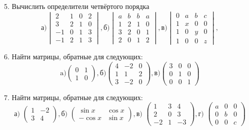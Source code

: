 \documentclass[12pt]{article}
\begin{document}
5. Вычислить определители четвёртого порядка
\[
\text{а)}\begin{vmatrix}
2 & 1 & 0 & 2\\
3 & 2 & 1 & 0\\
-1 & 0 & 1 & 3\\
-1 & 2 & 1 & 3
\end{vmatrix},
\text{б)}\begin{vmatrix}
a & b & b & a\\
1 & 2 & 1 & 0\\
3 & 2 & 0 & 1\\
2 & 0 & 1 & 2
\end{vmatrix},
\text{в)}\begin{vmatrix}
0 & a & b & c\\
1 & x & 0 & 0\\
1 & 0 & y & 0\\
1 & 0 & 0 & z
\end{vmatrix},
\]

6. Найти матрицы, обратные для следующих:
\[
\text{a)} \begin{pmatrix}
0 & 1\\
1 & 0
\end{pmatrix},
\text{б)} \begin{pmatrix}
4 & -2 & 0\\
1 & 1 & 2\\
3 & -2 & 0
\end{pmatrix},
\text{в)}
\begin{pmatrix}
3 & 0 & 0\\
0 & 1 & 0\\
0 & 0 & 1
\end{pmatrix}
\]

7. Найти матрицы, обратные для следующих:
\[
\text{а) }\begin{pmatrix}
1 & -2\\
3 & 4
\end{pmatrix},
\text{б) }\begin{pmatrix}
\sin x  & \cos x \\
-\cos x & \sin x
\end{pmatrix},
\text{в) }\begin{pmatrix}
1 & 3 & 4\\
2 & 0 & 3\\
-2 & 1 & -3
\end{pmatrix},
\text{г) }\begin{pmatrix}
a & 0 & 0\\
0 & b & 0\\
0 & 0 & c
\end{pmatrix}
\]
\end{document}
